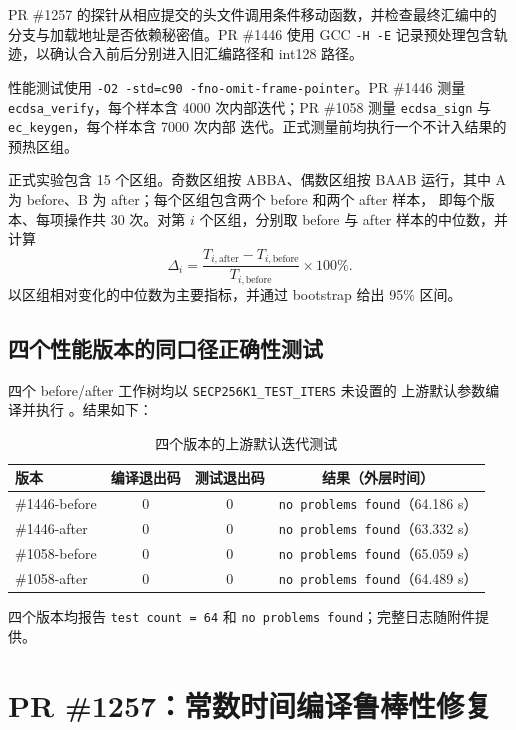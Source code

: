 \documentclass[UTF8,a4paper,zihao=-4]{ctexart}
\begin{document}
PR \#1257 的探针从相应提交的头文件调用条件移动函数，并检查最终汇编中的
分支与加载地址是否依赖秘密值\cite{barthe-ct}。PR \#1446 使用 GCC
\texttt{-H -E} 记录预处理包含轨迹，以确认合入前后分别进入旧汇编路径和
int128 路径。

性能测试使用
\texttt{-O2 -std=c90 -fno-omit-frame-pointer}。PR \#1446 测量
\texttt{ecdsa\_verify}，每个样本含 4000 次内部迭代；PR \#1058 测量
\texttt{ecdsa\_sign} 与 \texttt{ec\_keygen}，每个样本含 7000 次内部
迭代。正式测量前均执行一个不计入结果的预热区组。

正式实验包含 15 个区组。奇数区组按 ABBA、偶数区组按 BAAB 运行，其中
A 为 before、B 为 after；每个区组包含两个 before 和两个 after 样本，
即每个版本、每项操作共 30 次。对第 $i$ 个区组，分别取 before 与 after
样本的中位数，并计算
\begin{equation}
\Delta_i=
\frac{T_{i,\mathrm{after}}-T_{i,\mathrm{before}}}
     {T_{i,\mathrm{before}}}\times100\%.
\end{equation}
以区组相对变化的中位数为主要指标，并通过 bootstrap 给出 95\% 区间。

\subsection{四个性能版本的同口径正确性测试}

四个 before/after 工作树均以 \texttt{SECP256K1\_TEST\_ITERS} 未设置的
上游默认参数编译并执行 。结果如下：

\begin{table}[H]
\centering
\caption{四个版本的上游默认迭代测试}
\small
\begin{tabular}{lccc}
\toprule
版本 & 编译退出码 & 测试退出码 & 结果（外层时间）\\
\midrule
\#1446-before & 0 & 0 & \texttt{no problems found}（64.186 s）\\
\#1446-after  & 0 & 0 & \texttt{no problems found}（63.332 s）\\
\#1058-before & 0 & 0 & \texttt{no problems found}（65.059 s）\\
\#1058-after  & 0 & 0 & \texttt{no problems found}（64.489 s）\\
\bottomrule
\end{tabular}
\end{table}

四个版本均报告 \texttt{test count = 64} 和
\texttt{no problems found}；完整日志随附件提供。

\section{PR \#1257：常数时间编译鲁棒性修复}
\end{document}
